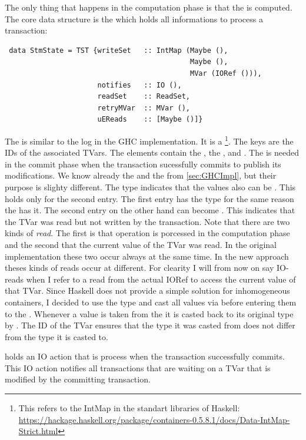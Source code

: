 The only thing that happens in the computation phase is that the  is computed.
The core data structure is the  which holds all informations to process a transaction:
\begin{lstlisting}
 data StmState = TST {writeSet   :: IntMap (Maybe (),
                                            Maybe (),
                                            MVar (IORef ())),
                      notifies   :: IO (),
                      readSet    :: ReadSet,
                      retryMVar  :: MVar (),
                      uEReads    :: [Maybe ()]}
\end{lstlisting}
The  is similar to the log in the GHC implementation. It is a  
\footnote{This refers to the IntMap in the standart libraries of Haskell: \url{https://hackage.haskell.org/package/containers-0.5.8.1/docs/Data-IntMap-Strict.html}}. 
The keys are the IDs of the associated TVars. The elements contain the ,
the , and . The  is needed in the commit
phase when the transaction sucessfully commits to publish its modifications. We know already the 
 and the  from \ref{sec:GHCImpl}, but their purpose is slighty 
different. The  type indicates that the values also can be . This holds
only for the second entry. The first entry has the  type for the same reason the 
 has it. The second entry on the other hand can become . This indicates
that the TVar was read but not written by the transaction. Note that there are two kinds of 
\textit{read}. The first is that  operation is porcessed in the computation phase
and the second that the current value of the TVar was read. In the original implementation these 
two occur always at the same time. In the new approach theses kinds of reads occur at different.
For clearity I will from now on say IO-reads when I refer to a read from the actual IORef to access
the current value of that TVar. Since Haskell does not provide a simple solution for inhomogeneous
containers, I decided to use the type \code{()} and cast all values via  before
entering them to the . Whenever a value is taken from the  it
is casted back to its original type by . The ID of the TVar ensures that 
the type it was casted from does not differ from the type it is casted to.

 holds an IO action that is process when the transaction successfully commits.
This IO action notifies all transactions that are waiting on a TVar that is modified by the 
committing transaction.

